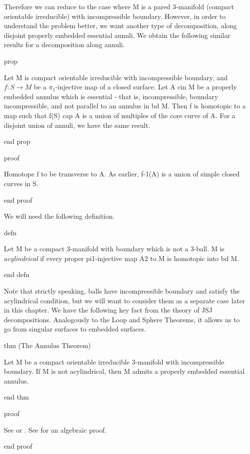 Therefore we can reduce to the case where M is a pared 3-manifold (compact
orientable irreducible) with incompressible boundary. However, in order to
understand the problem better, we want another type of decomposition, along
disjoint properly embedded essential annuli. We obtain the following similar
results for a decomposition along annuli.

prop

Let M is compact orientable irreducible with incompressible boundary, and $f
\colon S \to M$ be a $\pi_1$-injective map of a closed surface. Let A cin M be
a properly embedded annulus which is essential - that is, incompressible,
boundary incompressible, and not parallel to an annulus in bd M. Then f is
homotopic to a map such that f(S) cap A is a union of multiples of the core
curve of A. For a disjoint union of annuli, we have the same result.

end prop

proof

Homotope f to be transverse to A. As earlier, f-1(A) is a union of simple
closed curves in S.

end proof


We will need the following definition.

defn

Let M be a compact 3-manifold with boundary which is not a 3-ball. M is
\emph{acylindrical} if every proper pi1-injective map A2 to M is homotopic into
bd M.

end defn

Note that strictly speaking, balls have incompressible boundary and satisfy the
acylindrical condition, but we will want to consider them as a separate case
later in this chapter. We have the following key fact from the theory of JSJ
decompositions.  Analogously to the Loop and Sphere Theorems, it allows us to
go from singular surfaces to embedded surfaces.

thm (The Annulus Theorem)

Let M be a compact orientable irreducible 3-manifold with incompressible
boundary. If M is not acylindrical, then M admits a properly embedded essential
annulus.

end thm

proof

See \cite{JacoShalen} or \cite{Johannson}. See \cite{Scottannulus} for an
algebraic proof.

end proof

